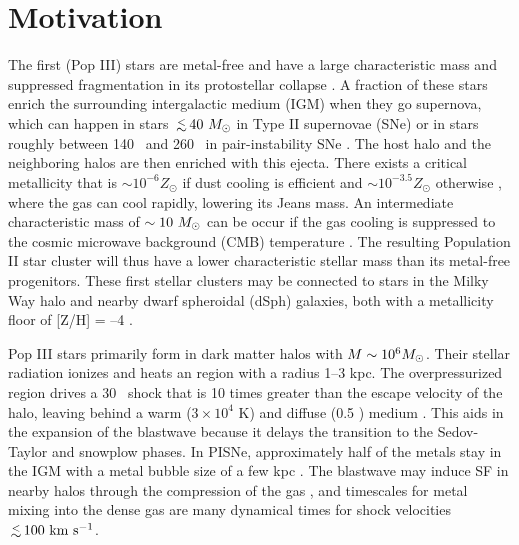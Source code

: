 \documentclass[apjl]{emulateapj}
\newcommand{\kms}{\ifmmode{{\rm km~s^{-1}}}\else{km s$^{-1}$}\fi}
\newcommand{\cubecm}{\ifmmode{{\rm cm^{-3}}}\else{cm$^{-3}$}\fi}
\newcommand{\lsim}{\lower0.3em\hbox{$\,\buildrel <\over\sim\,$}}
\newcommand{\Ms}{\ifmmode{M_\odot}\else{$M_\odot$}\fi}
\begin{document}

\section{Motivation}

The first (Pop III) stars are metal-free and have a large
characteristic mass and suppressed fragmentation in its protostellar
collapse \citep{ABN02, Bromm02_P3, OShea07a}.  A fraction of these
stars enrich the surrounding intergalactic medium (IGM) when they go
supernova, which can happen in stars $\lsim 40~\Ms$ in Type II
supernovae (SNe) or in stars roughly between 140 \Ms~and 260 \Ms~in
pair-instability SNe \citep[PISNe;][]{2002ApJ...567..532H}.  The host
halo and the neighboring halos are then enriched with this ejecta.
There exists a critical metallicity that is $\sim 10^{-6} Z_\odot$ if
dust cooling is efficient \citep{Omukai05, Schneider06_Frag, clark08}
and $\sim 10^{-3.5} Z_\odot$ otherwise \citep{Bromm01,
  2009ApJ...691..441S}, where the gas can cool rapidly, lowering its
Jeans mass.  An intermediate characteristic mass of $\sim10~\Ms$ can
be occur if the gas cooling is suppressed to the cosmic microwave
background (CMB) temperature \citep{Larson98, Tumlinson07_IMF,
  2009ApJ...691..441S}.  The resulting Population II star cluster will
thus have a lower characteristic stellar mass than its metal-free
progenitors.  These first stellar clusters may be connected to stars
in the Milky Way halo and nearby dwarf spheroidal (dSph) galaxies,
both with a metallicity floor of [Z/H] = --4 \citep{Beers05,
  Tafelmeyer10, Frebel10_Obs}.

Pop III stars primarily form in dark matter halos with $M \sim 10^6
\Ms$.  Their stellar radiation ionizes and heats an  region
with a radius 1--3 kpc.  The overpressurized  region drives
a 30 \kms~shock that is 10 times greater than the escape velocity of
the halo, leaving behind a warm ($3 \times 10^4$ K) and diffuse (0.5
\cubecm) medium \citep{Kitayama04, Whalen04, Abel07}.  This aids in
the expansion of the blastwave because it delays the transition to the
Sedov-Taylor and snowplow phases.  In PISNe, approximately half of the
metals stay in the IGM with a metal bubble size of a few kpc
\citep{Wise08_Gal, Greif10}.  The blastwave may induce SF in nearby
halos through the compression of the gas \citep{Ferrara98}, and
timescales for metal mixing into the dense gas are many dynamical
times \citep{Cen08} for shock velocities $\lsim100~\kms$.
\end{document}
